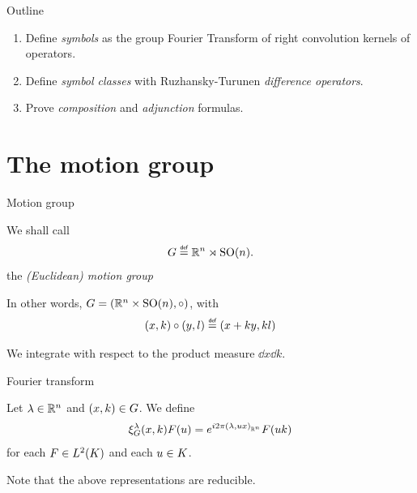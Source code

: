 \documentclass[handout]{beamer}
\begin{document}
\begin{frame}{Outline}
    \begin{enumerate}
        \item Define \emph{symbols} as the group Fourier Transform of right convolution kernels of operators.
        \item Define \emph{symbol classes} with Ruzhansky-Turunen \emph{difference operators}.
        \item Prove \emph{composition} and \emph{adjunction} formulas.
    \end{enumerate}
\end{frame}

\section{The motion group}

\begin{frame}{Motion group}
    \begin{definition}
        We shall call
        \begin{align*}
            \Group \defeq \R^n \rtimes \SpecialOrthogonalGroup n.
        \end{align*}
        the \emph{(Euclidean) motion group}
    \end{definition}

    \pause

    In other words, $G = (\R^n \times \SpecialOrthogonalGroup n, \circ)$,
    with
    \begin{align*}
        (x, k) \circ (y, l) \defeq (x + k y, k l)
    \end{align*}

    \pause

    We integrate with respect to the product measure $\dd x \dd k$.
\end{frame}

\begin{frame}{Fourier transform}
    \begin{definition}[Representations]
        Let $\lambda \in \R^n$ and $(x, k) \in \Group$.
        We define
        \begin{align*}
            \Rep \lambda(x, k) F(u)
            = \e^{\i \turn \ip [\R^n] \lambda {u x}} F(u k)
        \end{align*}
        for each $F \in \Lebesgue 2 \CompactGroup$ and each $u \in \CompactGroup$.
    \end{definition}

    Note that the above representations are reducible.
\end{frame}
\end{document}
